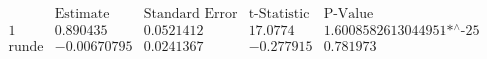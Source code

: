 \[\begin{array}{l|llll}
 \text{} & \text{Estimate} & \text{Standard Error} & \text{t-Statistic} & \text{P-Value} \\
\hline
 1 & 0.890435 & 0.0521412 & 17.0774 & \text{1.6008582613044951$\grave{ }$*${}^{\wedge}$-25} \\
 \text{runde} & -0.00670795 & 0.0241367 & -0.277915 & 0.781973 \\
\end{array}\]

